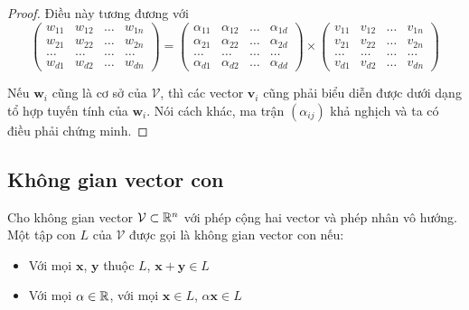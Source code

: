 \begin{proof}
    Điều này tương đương với 
    \begin{equation*}
        \begin{pmatrix}
            w_{11} & w_{12} & \ldots & w_{1n} \\
            w_{21} & w_{22} & \ldots & w_{2n} \\
            \ldots & \ldots & \ldots & \ldots \\
            w_{d1} & w_{d2} & \ldots & w_{dn}
        \end{pmatrix}
        = \begin{pmatrix}
            \alpha_{11} & \alpha_{12} & \ldots & \alpha_{1d} \\
            \alpha_{21} & \alpha_{22} & \ldots & \alpha_{2d} \\
            \ldots & \ldots & \ldots & \ldots \\
            \alpha_{d1} & \alpha_{d2} & \ldots & \alpha_{dd}
        \end{pmatrix}
        \times \begin{pmatrix}
            v_{11} & v_{12} & \ldots & v_{1n} \\ 
            v_{21} & v_{22} & \ldots & v_{2n} \\ 
            \ldots & \ldots & \ldots & \ldots \\ 
            v_{d1} & v_{d2} & \ldots & v_{dn}
        \end{pmatrix}
    \end{equation*}
    
    Nếu $\bm{w}_i$ cũng là cơ sở của $\mathcal{V}$, thì các vector $\bm{v}_i$ cũng phải
    biểu diễn được dưới dạng tổ hợp tuyến tính của $\bm{w}_i$.
    Nói cách khác, ma trận $(\alpha_{ij})$ khả nghịch và ta có điều phải chứng minh.
\end{proof}

\subsection*{Không gian vector con}

Cho không gian vector $\mathcal{V} \subset \mathbb{R}^n$ với phép cộng hai vector
và phép nhân vô hướng. Một tập con $L$ của $\mathcal{V}$ được gọi
là không gian vector con nếu:

\begin{itemize}
    \item Với mọi $\bm{x}$, $\bm{y}$ thuộc $L$, $\bm{x} + \bm{y} \in L$
    \item Với mọi $\alpha \in \mathbb{R}$, với mọi $\bm{x} \in L$, $\alpha \bm{x} \in L$
\end{itemize}

